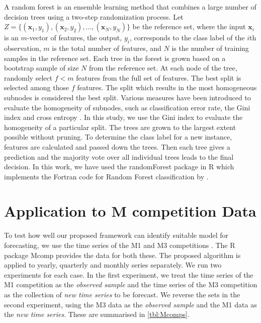 \documentclass[11pt,a4paper,]{article}
\theoremstyle{definition}
\theoremstyle{definition}
\theoremstyle{definition}
\theoremstyle{remark}
\begin{document}
A random forest \autocite{breiman2001random} is an ensemble learning
method that combines a large number of decision trees using a two-step
randomization process. Let
\(Z=\{(\bm{x}_1, y_1), (\bm{x}_2, y_2), \dots, (\bm{x}_N, y_N)\}\) be
the reference set, where the input \(\bm{x}_i\) is an \(m\)-vector of
features, the output, \(y_i\), corresponds to the class label of the
\(i\)th observation, \(m\) is the total number of features, and \(N\) is
the number of training samples in the reference set. Each tree in the
forest is grown based on a bootstrap sample of size \(N\) from the
reference set. At each node of the tree, randomly select \(f<m\)
features from the full set of features. The best split is selected among
those \(f\) features. The split which results in the most homogeneous
subnodes is considered the best split. Various measures have been
introduced to evaluate the homogeneity of subnodes, such as
classification error rate, the Gini index and cross entropy
\autocite{friedman2001elements}. In this study, we use the Gini index to
evaluate the homogeneity of a particular split. The trees are grown to
the largest extent possible without pruning. To determine the class
label for a new instance, features are calculated and passed down the
trees. Then each tree gives a prediction and the majority vote over all
individual trees leads to the final decision. In this work, we have used
the randomForest package \autocites{liaw2002randomforest}{rfpkg} in R
\autocite{Rcore} which implements the Fortran code for Random Forest
classification by \textcite{breiman2004random}.

\section{Application to M competition Data}\label{Mcomp}

To test how well our proposed framework can identify suitable model for
forecasting, we use the time series of the M1
\autocite{makridakis1982accuracy} and M3 competitions
\autocite{makridakis2000m3}. The R package Mcomp \autocite{hyndmanmcomp}
provides the data for both these. The proposed algorithm is applied to
yearly, quarterly and monthly series separately. We run two experiments
for each case. In the first experiment, we treat the time series of the
M1 competition as the \emph{observed sample} and the time series of the
M3 competition as the collection of \emph{new time series} to be
forecast. We reverse the sets in the second experiment, using the M3
data as the \emph{observed sample} and the M1 data as the \emph{new time
series}. These are summarised in \autoref{tbl:Mcomps}.
\end{document}
